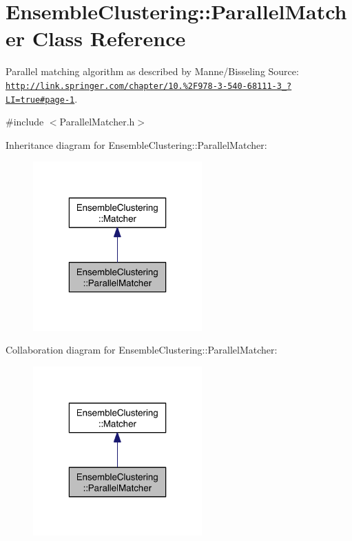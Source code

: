 \hypertarget{class_ensemble_clustering_1_1_parallel_matcher}{\section{Ensemble\-Clustering\-:\-:Parallel\-Matcher Class Reference}
\label{class_ensemble_clustering_1_1_parallel_matcher}
}


Parallel matching algorithm as described by Manne/\-Bisseling Source\-: \href{http://link.springer.com/chapter/10.1007%2F978-3-540-68111-3_74?LI=true#page-1}{\tt http\-://link.\-springer.\-com/chapter/10.\-1007\%2\-F978-\/3-\/540-\/68111-\/3\-\_\-74?\-L\-I=true\#page-\/1}.  




{\ttfamily \#include $<$Parallel\-Matcher.\-h$>$}



Inheritance diagram for Ensemble\-Clustering\-:\-:Parallel\-Matcher\-:\nopagebreak
\begin{figure}[H]
\begin{center}
\leavevmode
\includegraphics[width=184pt]{class_ensemble_clustering_1_1_parallel_matcher__inherit__graph}
\end{center}
\end{figure}


Collaboration diagram for Ensemble\-Clustering\-:\-:Parallel\-Matcher\-:\nopagebreak
\begin{figure}[H]
\begin{center}
\leavevmode
\includegraphics[width=184pt]{class_ensemble_clustering_1_1_parallel_matcher__coll__graph}
\end{center}
\end{figure}
